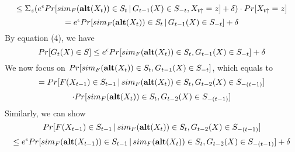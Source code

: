 \documentclass[11pt]{article}
\begin{document}
\begin{enumerate}
\[
\leq \Sigma_{z} (e^{\epsilon} Pr[sim_{F} ({\bf alt}(X_{t})) \in S_{t}\,|\,G_{t-1}(X) \in S_{-t},  X_{t \uparrow}=z] + \delta)\cdot Pr[X_{t \uparrow}=z]
\]
\[
=e^{\epsilon} Pr[sim_{F} ({\bf alt}(X_{t})) \in S_{t}\,|\,G_{t-1}(X) \in S_{-t}] + \delta
\]
By equation (4), we have
\begin{equation}
Pr[G_{t}(X) \in S] \leq e^{\epsilon} Pr[ sim_{F} ({\bf alt}(X_{t})) \in S_{t}, G_{t-1}(X) \in S_{-t}] + \delta
\end{equation}
We now focus on $Pr[ sim_{F} ({\bf alt}(X_{t})) \in S_{t}, G_{t-1}(X) \in S_{-t}] $, which equals to
\[
=Pr[F(X_{t-1}) \in S_{t-1}\,|\,sim_{F} ({\bf alt}(X_{t})) \in S_{t}, G_{t-2}(X) \in S_{-(t-1)}]
\]
\[
\cdot Pr [sim_{F} ({\bf alt}(X_{t})) \in S_{t}, G_{t-2}(X) \in S_{-(t-1)}]
\]
Similarly, we can show
\[
Pr[F(X_{t-1}) \in S_{t-1}\,|\,sim_{F} ({\bf alt}(X_{t})) \in S_{t}, G_{t-2}(X) \in S_{-(t-1)}]
\]
\[
\leq e^{\epsilon} Pr[sim_{F}({\bf alt}(X_{t-1})) \in S_{t-1}\,|\,sim_{F} ({\bf alt}(X_{t})) \in S_{t}, G_{t-2}(X) \in S_{-(t-1)}]+\delta
\]
\end{enumerate}
\end{document}
